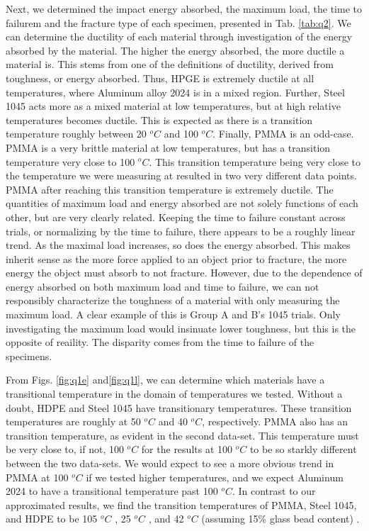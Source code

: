 \documentclass{article}
\begin{document}
Next, we determined the impact energy absorbed, the maximum load, the time to failurem and the fracture type of each specimen, presented in Tab. \ref{tab:q2}. We can determine the ductility of each material through investigation of the energy absorbed by the material. The higher the energy absorbed, the more ductile a material is. This stems from one of the definitions of ductility, derived from toughness, or energy absorbed. Thus, HPGE is extremely ductile at all temperatures, where Aluminum alloy 2024 is in a mixed region. Further, Steel 1045 acts more as a mixed material at low temperatures, but at high relative temperatures becomes ductile. This is expected as there is a transition temperature roughly between 20 $^oC$ and 100 $^oC$. Finally, PMMA is an odd-case. PMMA is a very brittle material at low temperatures, but has a transition temperature very close to 100 $^oC$. This transition temperature being very close to the temperature we were measuring at resulted in two very different data points. PMMA after reaching this transition temperature is extremely ductile. The quantities of maximum load and energy absorbed are not solely functions of each other, but are very clearly related. Keeping the time to failure constant across trials, or normalizing by the time to failure, there appears to be a roughly linear trend. As the maximal load increases, so does the energy absorbed. This makes inherit sense as the more force applied to an object prior to fracture, the more energy the object must absorb to not fracture. However, due to the dependence of energy absorbed on both maximum load and time to failure, we can not responsibly characterize the toughness of a material with only measuring the maximum load. A clear example of this is Group A and B's 1045 trials. Only investigating the maximum load would insinuate lower toughness, but this is the opposite of reaility. The disparity comes from the time to failure of the specimens.

From Figs. \ref{fig:q1e} and\ref{fig:q1l}, we can determine which materials have a transitional temperature in the domain of temperatures we tested. Without a doubt, HDPE and Steel 1045 have transitionary temperatures. These transition temperatures are roughly at  50 $^oC$ and 40 $^oC$, respectively. PMMA also has an transition temperature, as evident in the second data-set. This temperature must be very close to, if not, 100 $^oC$ for the results at 100 $^oC$ to be so starkly different between the two data-sets. We would expect to see a more obvious trend in PMMA at 100 $^oC$ if we tested higher temperatures, and we expect Aluminum 2024 to have a transitional temperature past 100 $^oC$. In contrast to our approximated results, we find the transition temperatures of PMMA, Steel 1045, and HDPE to be 105 $^oC$ \cite{pmma}, 25 $^oC$ \cite{1045}, and 42 $^oC$ (assuming 15\% glass bead content) \cite{hdpe}.
\end{document}

